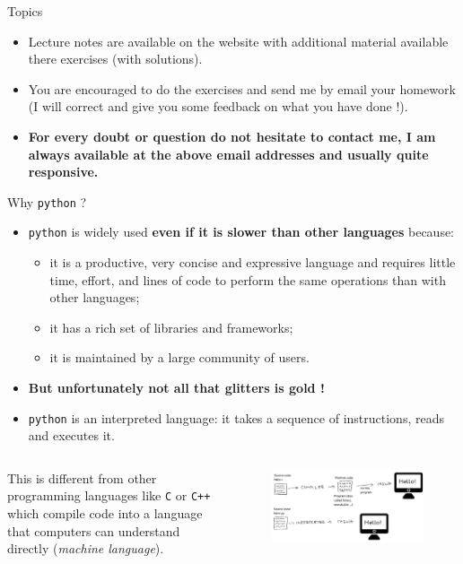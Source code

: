 \documentclass{beamer}
\begin{document}
\begin{frame}{Topics}
  \begin{itemize}
    \item Lecture notes are available on the website with additional material available there exercises (with solutions). 
    \item You are encouraged to do the exercises and send me by email your homework (I will correct and give you some feedback on what you have done !).
    \item \textbf{For every doubt or question do not hesitate to contact me, I am always available at the above email addresses and usually quite responsive.}
  \end{itemize}
\end{frame}

\begin{frame}{Why \texttt{python} ?}
  \begin{itemize}
  \item \texttt{python} is widely used \textbf{even if it is slower than other languages} because:
    \begin{itemize}
    \item it is a productive, very concise and expressive language and requires little time, effort, and lines of code to perform the same operations than with other languages;
    \item it has a rich set of libraries and frameworks;
    \item it is maintained by a large community of users.
    \end{itemize}

    \item \textbf{But unfortunately not all that glitters is gold !}

    \item \texttt{python} is an interpreted language: it takes a sequence of instructions, reads and executes it.
  \end{itemize}
  
  \begin{columns}
    This is different from other programming languages like \texttt{C} or \texttt{C++} which compile code into a language that computers can understand directly (\emph{machine language}).
    \begin{figure}[h]
      \begin{center}
        \includegraphics[width=0.8\linewidth]{compiled_vs_interpreted}
      \end{center}
    \end{figure}
  \end{columns}
\end{frame}
\end{document}

